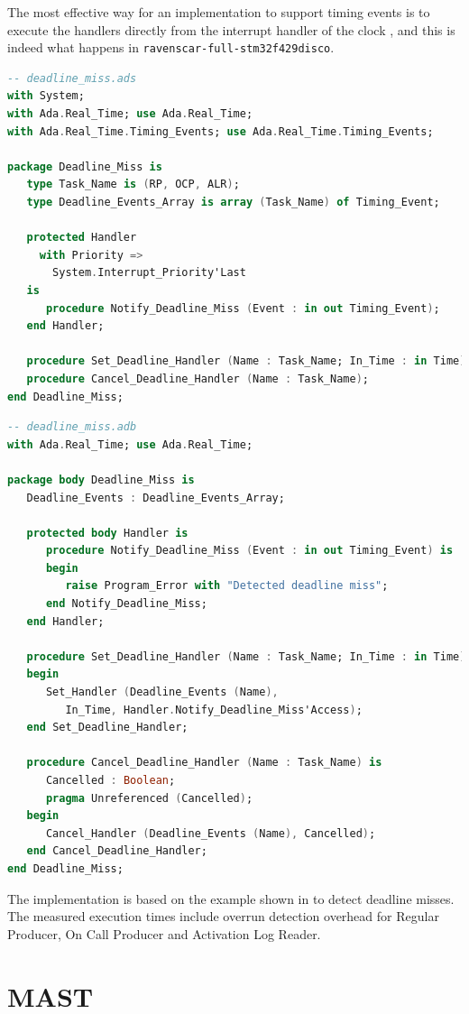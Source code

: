 \documentclass{article}
\begin{document}
The most effective way for an implementation to support timing events is to execute the handlers directly from the interrupt handler of the clock \cite{timing-events}, and this is indeed what happens in \texttt{ravenscar-full-stm32f429disco}.

\begin{lstlisting}[language=Ada]
-- deadline_miss.ads
with System;
with Ada.Real_Time; use Ada.Real_Time;
with Ada.Real_Time.Timing_Events; use Ada.Real_Time.Timing_Events;

package Deadline_Miss is
   type Task_Name is (RP, OCP, ALR);
   type Deadline_Events_Array is array (Task_Name) of Timing_Event;

   protected Handler
     with Priority =>
       System.Interrupt_Priority'Last
   is
      procedure Notify_Deadline_Miss (Event : in out Timing_Event);
   end Handler;

   procedure Set_Deadline_Handler (Name : Task_Name; In_Time : in Time);
   procedure Cancel_Deadline_Handler (Name : Task_Name);
end Deadline_Miss;
\end{lstlisting}

\begin{lstlisting}[language=Ada]
-- deadline_miss.adb
with Ada.Real_Time; use Ada.Real_Time;

package body Deadline_Miss is
   Deadline_Events : Deadline_Events_Array;

   protected body Handler is
      procedure Notify_Deadline_Miss (Event : in out Timing_Event) is
      begin
         raise Program_Error with "Detected deadline miss";
      end Notify_Deadline_Miss;
   end Handler;

   procedure Set_Deadline_Handler (Name : Task_Name; In_Time : in Time) is
   begin
      Set_Handler (Deadline_Events (Name),
         In_Time, Handler.Notify_Deadline_Miss'Access);
   end Set_Deadline_Handler;

   procedure Cancel_Deadline_Handler (Name : Task_Name) is
      Cancelled : Boolean;
      pragma Unreferenced (Cancelled);
   begin
      Cancel_Handler (Deadline_Events (Name), Cancelled);
   end Cancel_Deadline_Handler;
end Deadline_Miss;
\end{lstlisting}

The implementation is based on the example shown in \cite{overrundetection} to detect deadline misses. The measured execution times include overrun detection overhead for Regular Producer, On Call Producer and Activation Log Reader.

\section{MAST}
\end{document}
